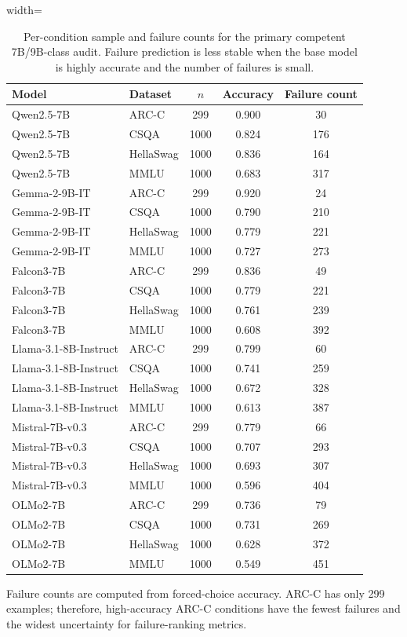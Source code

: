 
\begin{table}[t]
\centering
\scriptsize
\caption{Per-condition sample and failure counts for the primary competent 7B/9B-class audit. Failure prediction is less stable when the base model is highly accurate and the number of failures is small.}
\label{tab:failure-counts}
\begin{threeparttable}
\begin{adjustbox}{width=\textwidth}
\begin{tabular}{llccc}
\toprule
Model & Dataset & $n$ & Accuracy & Failure count \\
\midrule
Qwen2.5-7B & ARC-C & 299 & 0.900 & 30 \\
Qwen2.5-7B & CSQA & 1000 & 0.824 & 176 \\
Qwen2.5-7B & HellaSwag & 1000 & 0.836 & 164 \\
Qwen2.5-7B & MMLU & 1000 & 0.683 & 317 \\
Gemma-2-9B-IT & ARC-C & 299 & 0.920 & 24 \\
Gemma-2-9B-IT & CSQA & 1000 & 0.790 & 210 \\
Gemma-2-9B-IT & HellaSwag & 1000 & 0.779 & 221 \\
Gemma-2-9B-IT & MMLU & 1000 & 0.727 & 273 \\
Falcon3-7B & ARC-C & 299 & 0.836 & 49 \\
Falcon3-7B & CSQA & 1000 & 0.779 & 221 \\
Falcon3-7B & HellaSwag & 1000 & 0.761 & 239 \\
Falcon3-7B & MMLU & 1000 & 0.608 & 392 \\
Llama-3.1-8B-Instruct & ARC-C & 299 & 0.799 & 60 \\
Llama-3.1-8B-Instruct & CSQA & 1000 & 0.741 & 259 \\
Llama-3.1-8B-Instruct & HellaSwag & 1000 & 0.672 & 328 \\
Llama-3.1-8B-Instruct & MMLU & 1000 & 0.613 & 387 \\
Mistral-7B-v0.3 & ARC-C & 299 & 0.779 & 66 \\
Mistral-7B-v0.3 & CSQA & 1000 & 0.707 & 293 \\
Mistral-7B-v0.3 & HellaSwag & 1000 & 0.693 & 307 \\
Mistral-7B-v0.3 & MMLU & 1000 & 0.596 & 404 \\
OLMo2-7B & ARC-C & 299 & 0.736 & 79 \\
OLMo2-7B & CSQA & 1000 & 0.731 & 269 \\
OLMo2-7B & HellaSwag & 1000 & 0.628 & 372 \\
OLMo2-7B & MMLU & 1000 & 0.549 & 451 \\
\bottomrule
\end{tabular}
\end{adjustbox}
\begin{tablenotes}[flushleft]\footnotesize\item Failure counts are computed from forced-choice accuracy. ARC-C has only 299 examples; therefore, high-accuracy ARC-C conditions have the fewest failures and the widest uncertainty for failure-ranking metrics.\end{tablenotes}
\end{threeparttable}
\end{table}
